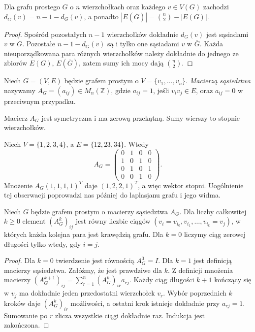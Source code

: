 \begin{stwierdzenie}
Dla grafu prostego $G$ o $n$ wierzchołkach oraz
każdego $v\in V(G)$ zachodzi
$d_{\overline G}(v)=n-1-d_G(v)$, a ponadto
$|E(\overline G)|=\binom n2-|E(G)|$.
\end{stwierdzenie}

\begin{proof}
Spośród pozostałych $n-1$ wierzchołków dokładnie
$d_G(v)$ jest sąsiadami $v$ w $G$. Pozostałe
$n-1-d_G(v)$ są i tylko one sąsiadami $v$ w
$\overline G$. Każda nieuporządkowana para różnych
wierzchołków należy dokładnie do jednego ze zbiorów
$E(G)$, $E(\overline G)$, zatem sumy ich mocy dają
$\binom n2$.
\end{proof}

\begin{definicja}
Niech $G=(V,E)$ będzie grafem prostym o
$V=\{v_1,\ldots,v_n\}$. \emph{Macierzą sąsiedztwa}
nazywamy $A_G=(a_{ij})\in M_n(\mathbb Z)$,
gdzie $a_{ij}=1$, jeśli $v_iv_j\in E$, oraz
$a_{ij}=0$ w przeciwnym przypadku.
\end{definicja}

Macierz $A_G$ jest symetryczna i ma zerową przekątną.
Sumy wierszy to stopnie wierzchołków.

\begin{przyklad}
Niech $V=\{1,2,3,4\}$, a $E=\{12,23,34\}$.
Wtedy
\[
A_G=\begin{pmatrix}
0&1&0&0\\1&0&1&0\\0&1&0&1\\0&0&1&0
\end{pmatrix}.
\]
Mnożenie $A_G(1,1,1,1)^T$ daje $(1,2,2,1)^T$,
a więc wektor stopni. Uogólnienie tej obserwacji
poprowadzi nas później do laplasjanu grafu i
jego widma.
\end{przyklad}

\begin{stwierdzenie}
Niech $G$ będzie grafem prostym o macierzy sąsiedztwa
$A_G$. Dla liczby całkowitej $k\ge0$ element
$(A_G^k)_{ij}$ jest równy liczbie ciągów
$(v_i=v_{i_0},v_{i_1},\ldots,v_{i_k}=v_j)$,
w których każda kolejna para jest krawędzią grafu.
Dla $k=0$ liczymy ciąg zerowej długości tylko wtedy,
gdy $i=j$.
\end{stwierdzenie}

\begin{proof}
Dla $k=0$ twierdzenie jest równością $A_G^0=I$.
Dla $k=1$ jest definicją macierzy sąsiedztwa.
Załóżmy, że jest prawdziwe dla $k$. Z definicji
mnożenia macierzy
$(A_G^{k+1})_{ij}=\sum_{r=1}^n(A_G^k)_{ir}a_{rj}$.
Każdy ciąg długości $k+1$ kończący się w $v_j$
ma dokładnie jeden przedostatni wierzchołek $v_r$.
Wybór poprzednich $k$ kroków daje $(A_G^k)_{ir}$
możliwości, a ostatni krok istnieje dokładnie przy
$a_{rj}=1$. Sumowanie po $r$ zlicza wszystkie
ciągi dokładnie raz. Indukcja jest zakończona.
\end{proof}

